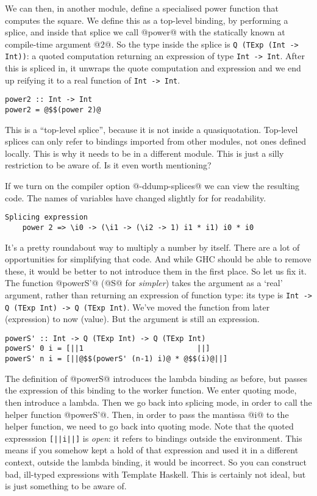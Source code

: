 We can then, in another module, define a specialised power function that computes the square.
We define this as a top-level binding, by performing a splice, and inside that splice we call @power@ with the statically known at compile-time argument @2@.
So the type inside the splice is \lstinline/Q (TExp (Int -> Int))/: a quoted computation returning an expression of type \lstinline/Int -> Int/.
After this is spliced in, it unwraps the quote computation and expression and we end up reifying it to a real function of \lstinline/Int -> Int/.

\begin{lstlisting}
power2 :: Int -> Int
power2 = @$$(power 2)@
\end{lstlisting}

This is a ``top-level splice'', because it is not inside a quasiquotation.
Top-level splices can only refer to bindings imported from other modules, not ones defined locally.
This is why it needs to be in a different module.
This is just a silly restriction to be aware of. Is it even worth mentioning?

If we turn on the compiler option @-ddump-splices@ we can view the resulting code.
The names of variables have changed slightly for for readability.

\begin{lstlisting}
Splicing expression
    power 2 => \i0 -> (\i1 -> (\i2 -> 1) i1 * i1) i0 * i0
\end{lstlisting}

It's a pretty roundabout way to multiply a number by itself. There are a lot of opportunities for simplifying that code. And while GHC should be able to remove these, it would be better to not introduce them in the first place.
So let us fix it.
The function @powerS'@ (@S@ for \emph{simpler}) takes the argument as a `real' argument, rather than returning an expression of function type: its type is \lstinline/Int -> Q (TExp Int) -> Q (TExp Int)/.
We've moved the function from later (expression) to now (value).
But the argument is still an expression.

\begin{lstlisting}
powerS' :: Int -> Q (TExp Int) -> Q (TExp Int)
powerS' 0 i = [||1                          ||]
powerS' n i = [||@$$(powerS' (n-1) i)@ * @$$(i)@||]
\end{lstlisting}

The definition of @powerS@ introduces the lambda binding as before, but passes the expression of this binding to the worker function.
We enter quoting mode, then introduce a lambda. Then we go back into splicing mode, in order to call the helper function @powerS'@.
Then, in order to pass the mantissa @i@ to the helper function, we need to go back into quoting mode.
Note that the quoted expresssion \lstinline/[||i||]/ is \emph{open}: it refers to bindings outside the environment.
This means if you somehow kept a hold of that expression and used it in a different context, outside the lambda binding, it would be incorrect.
So you can construct bad, ill-typed expressions with Template Haskell. This is certainly not ideal, but is just something to be aware of.

